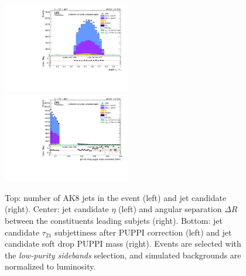 \begin{figure}[!htb]
\begin{center}
    \includegraphics[width=0.495\textwidth]{plots/v9_U/XVZnnlpSB/FatJet1_puppiTau21.pdf}
    \includegraphics[width=0.495\textwidth]{plots/v9_U/XVZnnlpSB/FatJet1_softdropPuppiMassCorr.pdf}

    \caption{Top: number of AK8 jets in the event (left) and \V jet candidate \pt (right). Center: \V jet candidate $\eta$ (left) and angular separation $\Delta R$ between the constituents leading subjets (right). Bottom: \V jet candidate $\tau_{21}$ subjettiness after PUPPI correction (left) and \V jet candidate soft drop PUPPI mass (right). Events are selected with the \emph{low-purity sidebands} selection, and simulated backgrounds are normalized to luminosity.}
  \end{center}
\end{figure}


